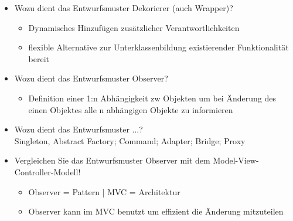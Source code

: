 \begin{itemize}
	\item Wozu dient das Entwurfsmuster Dekorierer (auch Wrapper)?
	\begin{itemize}
		\item Dynamisches Hinzufügen zusätzlicher Verantwortlichkeiten
		\item flexible Alternative zur Unterklassenbildung existierender Funktionalität bereit
	\end{itemize}
	
	\item Wozu dient das Entwurfsmuster Observer?
	\begin{itemize}
		\item Definition einer 1:n Abhängigkeit zw Objekten um bei Änderung des einen Objektes alle n abhängigen Objekte zu informieren
	\end{itemize}
	
	\item Wozu dient das Entwurfsmuster ...?\\
	Singleton, Abstract Factory; Command; Adapter; Bridge; Proxy
	
	\item Vergleichen Sie das Entwurfsmuster Observer mit dem Model-View-Controller-Modell!
	\begin{itemize}
		\item Observer = Pattern | MVC = Architektur
		\item Observer kann im MVC benutzt um effizient die Änderung mitzuteilen
	\end{itemize}
\end{itemize}
